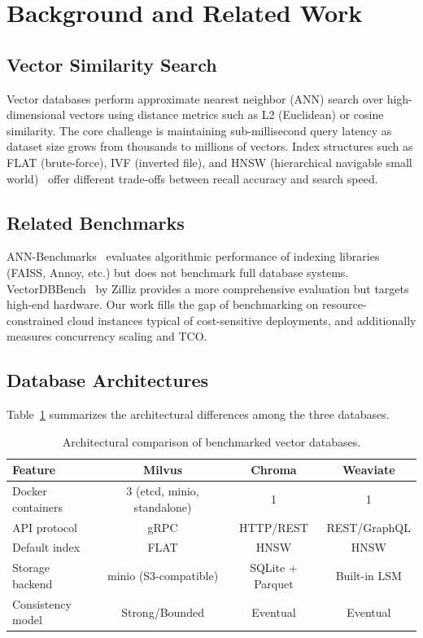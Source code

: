 \documentclass[12pt,a4paper]{article}
\begin{document}
\section{Background and Related Work}

\subsection{Vector Similarity Search}

Vector databases perform approximate nearest neighbor (ANN) search over high-dimensional vectors using distance metrics such as L2 (Euclidean) or cosine similarity. The core challenge is maintaining sub-millisecond query latency as dataset size grows from thousands to millions of vectors. Index structures such as FLAT (brute-force), IVF (inverted file), and HNSW (hierarchical navigable small world)~\cite{malkov2018hnsw} offer different trade-offs between recall accuracy and search speed.

\subsection{Related Benchmarks}

ANN-Benchmarks~\cite{annbenchmarks} evaluates algorithmic performance of indexing libraries (FAISS, Annoy, etc.) but does not benchmark full database systems. VectorDBBench~\cite{vectordbbench} by Zilliz provides a more comprehensive evaluation but targets high-end hardware. Our work fills the gap of benchmarking on resource-constrained cloud instances typical of cost-sensitive deployments, and additionally measures concurrency scaling and TCO.

\subsection{Database Architectures}

Table~\ref{tab:arch} summarizes the architectural differences among the three databases.

\begin{table}[H]
\centering
\caption{Architectural comparison of benchmarked vector databases.}
\label{tab:arch}
\small
\begin{tabular}{lccc}
\toprule
\textbf{Feature} & \textbf{Milvus} & \textbf{Chroma} & \textbf{Weaviate} \\
\midrule
Docker containers & 3 (etcd, minio, standalone) & 1 & 1 \\
API protocol & gRPC & HTTP/REST & REST/GraphQL \\
Default index & FLAT & HNSW & HNSW \\
Storage backend & minio (S3-compatible) & SQLite + Parquet & Built-in LSM \\
Consistency model & Strong/Bounded & Eventual & Eventual \\
\bottomrule
\end{tabular}
\end{table}
\end{document}
